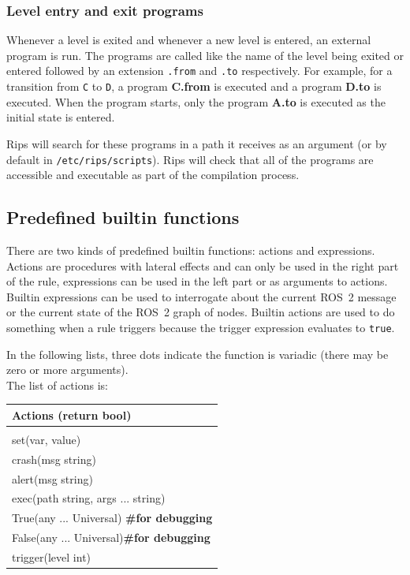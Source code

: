 \documentclass[a4paper]{article}
\begin{document}
\subsubsection{Level entry and exit programs}
Whenever a level is exited and whenever a new level is entered, an external program is run.
The programs are called like the name of the level being exited or entered followed
by an extension \texttt{.from} and \texttt{.to}
respectively.
For example, for a transition from \texttt{C}
to \texttt{D}, a program \textbf{C.from} is executed and a program \textbf{D.to} is executed.
When the program starts, only the program \textbf{A.to} is executed as the initial state
is entered.

Rips will search for these programs in a path it receives as an argument (or by
default in \texttt{/etc/rips/scripts}).
Rips will check that all of the programs are accessible and executable as part of the compilation
process.


\subsection{Predefined builtin functions\label{sec:predef}}

There are two kinds of predefined builtin functions: actions and expressions.
Actions are procedures with lateral effects and can only be used in the right part
of the rule, expressions can be used in the left part or as arguments to actions.
Builtin expressions can be used to interrogate about the current ROS~2  message or the current
state of the ROS~2  graph of nodes. Builtin actions are used to do something when a rule triggers
because the trigger expression evaluates to \verb+true+.

In the following lists, three dots indicate the function is variadic (there may
be zero or more arguments).
\\


The list of actions is:

\begin{tabular}{l}
\\
 Actions (return bool)\\
\hline\\
 set(var, value)\\
crash(msg string) \\
alert(msg string) \\
 exec(path string, args ... string)\\
 True(any ... Universal) \textbf{\#for debugging}\\
 False(any ... Universal)\textbf{\#for debugging}\\
trigger(level int)
\end{tabular}
\\
\end{document}
